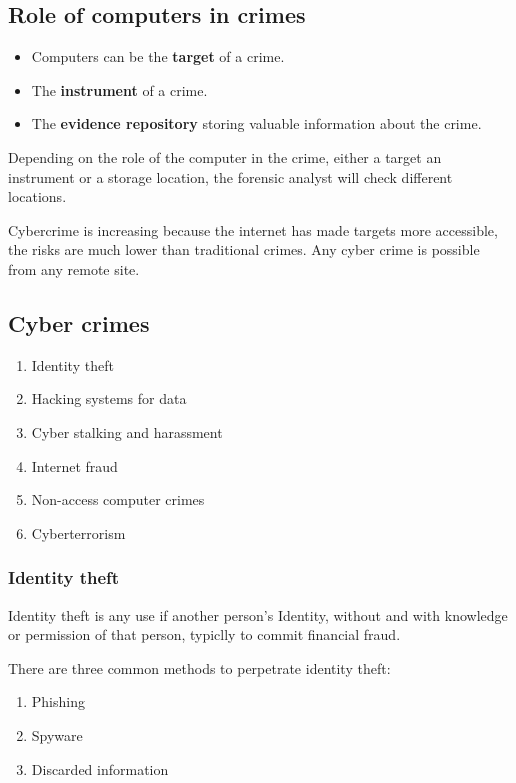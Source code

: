 \subsection{Role of computers in crimes}
\begin{itemize}
    \item Computers can be the \textbf{target} of a crime.
    \item The \textbf{instrument} of a crime.
    \item The \textbf{evidence repository} storing valuable information about the crime.
\end{itemize}

Depending on the role of the computer in the crime, either a target an instrument or a storage location, the forensic analyst will check different locations.

Cybercrime is increasing because the internet has made targets more accessible, the risks are much lower than traditional crimes.
Any cyber crime is possible from any remote site.

\subsection{Cyber crimes}
\begin{enumerate}
    \item Identity theft
    \item Hacking systems for data
    \item Cyber stalking and harassment
    \item Internet fraud
    \item Non-access computer crimes
    \item Cyberterrorism
\end{enumerate}

\subsubsection{Identity theft}
Identity theft is any use if another person's Identity, without and with knowledge or permission of that person, typiclly to commit financial fraud.

There are three common methods to perpetrate identity theft:
\begin{enumerate}
    \item Phishing
    \item Spyware
    \item Discarded information
\end{enumerate}

